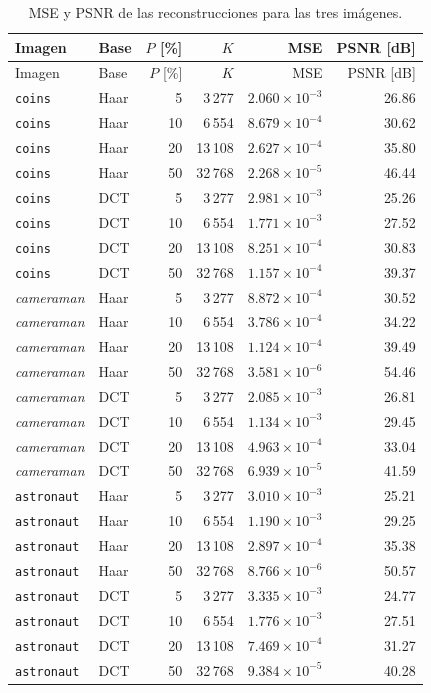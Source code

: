\documentclass[11pt,a4paper]{article}
\begin{document}
\begin{longtable}{llrrrr}
\caption{MSE y PSNR de las reconstrucciones para las tres imágenes.}\label{tab:reconstrucciones}\\
\toprule
Imagen & Base & $P$ [\%] & $K$ & MSE & PSNR [dB]\\
\midrule
\endfirsthead
\toprule
Imagen & Base & $P$ [\%] & $K$ & MSE & PSNR [dB]\\
\midrule
\endhead
\texttt{coins} & Haar & 5 & 3\,277 & $2.060\times10^{-3}$ & 26.86 \\
\texttt{coins} & Haar & 10 & 6\,554 & $8.679\times10^{-4}$ & 30.62 \\
\texttt{coins} & Haar & 20 & 13\,108 & $2.627\times10^{-4}$ & 35.80 \\
\texttt{coins} & Haar & 50 & 32\,768 & $2.268\times10^{-5}$ & 46.44 \\
\texttt{coins} & DCT & 5 & 3\,277 & $2.981\times10^{-3}$ & 25.26 \\
\texttt{coins} & DCT & 10 & 6\,554 & $1.771\times10^{-3}$ & 27.52 \\
\texttt{coins} & DCT & 20 & 13\,108 & $8.251\times10^{-4}$ & 30.83 \\
\texttt{coins} & DCT & 50 & 32\,768 & $1.157\times10^{-4}$ & 39.37 \\
\midrule
\textit{cameraman} & Haar & 5 & 3\,277 & $8.872\times10^{-4}$ & 30.52 \\
\textit{cameraman} & Haar & 10 & 6\,554 & $3.786\times10^{-4}$ & 34.22 \\
\textit{cameraman} & Haar & 20 & 13\,108 & $1.124\times10^{-4}$ & 39.49 \\
\textit{cameraman} & Haar & 50 & 32\,768 & $3.581\times10^{-6}$ & 54.46 \\
\textit{cameraman} & DCT & 5 & 3\,277 & $2.085\times10^{-3}$ & 26.81 \\
\textit{cameraman} & DCT & 10 & 6\,554 & $1.134\times10^{-3}$ & 29.45 \\
\textit{cameraman} & DCT & 20 & 13\,108 & $4.963\times10^{-4}$ & 33.04 \\
\textit{cameraman} & DCT & 50 & 32\,768 & $6.939\times10^{-5}$ & 41.59 \\
\midrule
\texttt{astronaut} & Haar & 5 & 3\,277 & $3.010\times10^{-3}$ & 25.21 \\
\texttt{astronaut} & Haar & 10 & 6\,554 & $1.190\times10^{-3}$ & 29.25 \\
\texttt{astronaut} & Haar & 20 & 13\,108 & $2.897\times10^{-4}$ & 35.38 \\
\texttt{astronaut} & Haar & 50 & 32\,768 & $8.766\times10^{-6}$ & 50.57 \\
\texttt{astronaut} & DCT & 5 & 3\,277 & $3.335\times10^{-3}$ & 24.77 \\
\texttt{astronaut} & DCT & 10 & 6\,554 & $1.776\times10^{-3}$ & 27.51 \\
\texttt{astronaut} & DCT & 20 & 13\,108 & $7.469\times10^{-4}$ & 31.27 \\
\texttt{astronaut} & DCT & 50 & 32\,768 & $9.384\times10^{-5}$ & 40.28 \\
\bottomrule
\end{longtable}
\end{document}
